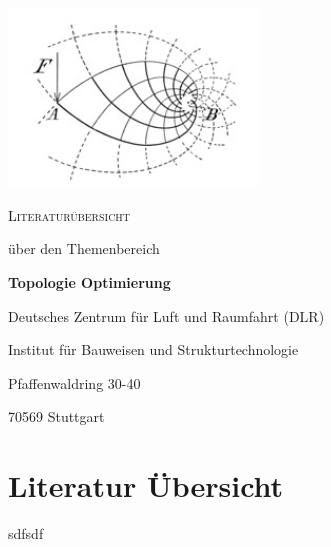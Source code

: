 \documentclass[
12pt, %
a4paper, %
oneside, %
]{article}
\begin{document}
\setlength\parindent{0pt} %



\begin{titlepage}
	\centering
	\includegraphics[width=0.5\textwidth]{michell_cantilever.jpg}\par\vspace{1cm}
	{\scshape\LARGE Literaturübersicht \par}
	\vspace{0.5cm}
	{ über den Themenbereich \par}
	\vspace{1.5cm}
	{\huge\bfseries Topologie Optimierung\par}
	\vspace{7cm}
	{Deutsches Zentrum für Luft und Raumfahrt (DLR) \par}
	{Institut für Bauweisen und Strukturtechnologie \par}
	\vspace{0.3cm}
	{Pfaffenwaldring 30-40 \par}
	{70569 Stuttgart \par}


	\vfill

\end{titlepage}








\section{Literatur Übersicht} %
\label{sec:literaturueberblick}




\newpage


sdfsdf
\newpage
\newpage


\end{document}
